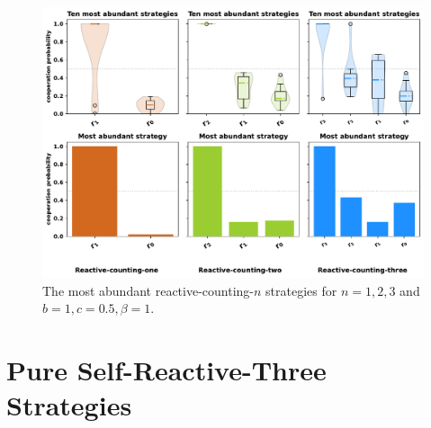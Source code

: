 \documentclass{article}
\theoremstyle{definition}
\begin{document}
\begin{figure}[!htbp]
  \includegraphics[width=\textwidth]{figures/abundant_strategies_counting.pdf}
  \caption{The most abundant reactive-counting-$n$ strategies for $n=1,2,3$ and $b=1, c=0.5, \beta=1$.}
\end{figure}


\section{Pure Self-Reactive-Three Strategies}

\begin{multicols}{3}

\end{multicols}

~\\

\end{document}
